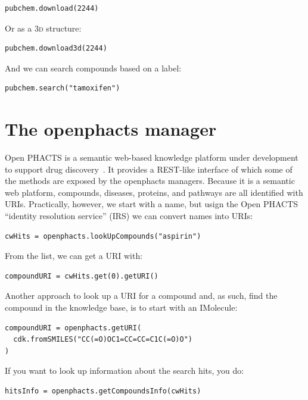 \documentclass{book}
\begin{document}
\begin{refsection}
\begin{Verbatim}
pubchem.download(2244)
\end{Verbatim}

Or as a 3\textsc{d} structure:

\begin{Verbatim}
pubchem.download3d(2244)
\end{Verbatim}

And we can search compounds based on a label:

\begin{Verbatim}
pubchem.search("tamoxifen")
\end{Verbatim}

\section{The openphacts manager}

Open PHACTS is a semantic web-based knowledge platform
under development to
support drug discovery~\cite{Williams2012}. It provides a REST-like interface
of which some of the methods are exposed by the openphacts managers. Because
it is a semantic web platform, compounds, diseases, proteins, and pathways 
are all identified with URIs. Practically, however, we start with a name,
but usign the Open PHACTS ``identity resolution service'' (IRS) we can convert
names into URIs:

\begin{Verbatim}
cwHits = openphacts.lookUpCompounds("aspirin")
\end{Verbatim}

From the list, we can get a URI with:

\begin{Verbatim}
compoundURI = cwHits.get(0).getURI()
\end{Verbatim}

Another approach to look up a URI for a compound and, as such, find the compound
in the knowledge base, is to start with an IMolecule:

\begin{Verbatim}
compoundURI = openphacts.getURI(
  cdk.fromSMILES("CC(=O)OC1=CC=CC=C1C(=O)O")
)
\end{Verbatim}

If you want to look up information about the search hits, you do:

\begin{Verbatim}
hitsInfo = openphacts.getCompoundsInfo(cwHits)
\end{Verbatim}


\end{refsection}
\end{document}
